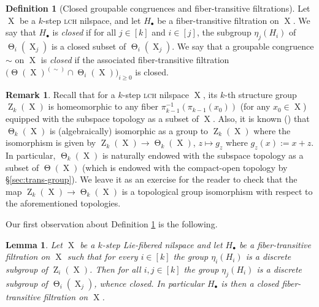 \documentclass[a4paper,12pt,reqno]{amsart}
\newtheorem{lemma}[theorem]{Lemma}
\theoremstyle{definition}
\newtheorem{defn}[theorem]{Definition}
\newtheorem{remark}[theorem]{Remark}
\def\to{\rightarrow}
\DeclareMathOperator{\ab}{Z}
\DeclareMathOperator{\tran}{\Theta}
\DeclareMathOperator{\ns}{X}
\begin{document}
\begin{defn}[Closed groupable congruences and fiber-transitive filtrations]\label{def:oldclosed}
Let $\ns$ be a $k$-step \textsc{lch} nilspace, and let $H_\bullet$ be a fiber-transitive filtration on $\ns$. We say that $H_\bullet$ is \emph{closed} if for all $j\in [k]$ and $i\in[j]$, the subgroup $\eta_j(H_i)$ of $\tran_i(\ns_j)$ is a closed subset of $\tran_i(\ns_j)$. We say that a groupable congruence $\sim$ on $\ns$ is \emph{closed} if the associated fiber-transitive filtration $\big(\tran(\ns)^{(\sim)}\cap \tran_i(\ns)\big)_{i\geq 0}$ is closed.
\end{defn}

\begin{remark}
Recall that for a $k$-step \textsc{lch} nilspace $\ns$, its $k$-th structure group $\ab_k(\ns)$ is  homeomorphic to any fiber $\pi_{k-1}^{-1}(\pi_{k-1}(x_0))$ (for any $x_0\in \ns$) equipped with the subspace topology as a subset of $\ns$. Also, it is known (\cite[Lemma 3.2.37]{Cand:Notes1}) that $\tran_k(\ns)$ is (algebraically) isomorphic as a group to $\ab_k(\ns)$ where the isomorphism is given by $\ab_k(\ns)\to \tran_k(\ns)$, $z\mapsto g_z$ where $g_z(x):=x+z$. In particular, $\tran_k(\ns)$ is naturally endowed with the subspace topology as a subset of $\tran(\ns)$ (which is endowed with the compact-open topology by \S \ref{sec:trans-group}). We leave it as an exercise for the reader to check that the map $\ab_k(\ns)\to \tran_k(\ns)$ is a topological group isomorphism with respect to the aforementioned topologies.
\end{remark}
\noindent Our first observation about Definition \ref{def:oldclosed} is the following.
\begin{lemma}\label{lem:closedconseq}
Let $\ns$ be a $k$-step Lie-fibered nilspace and let $H_\bullet$ be a fiber-transitive filtration on $\ns$ such that for every $i\in [k]$ the group $\eta_i(H_i)$ is a discrete subgroup of $\ab_i(\ns)$. Then for all $i,j\in [k]$ the group $\eta_j(H_i)$ is a discrete subgroup of $\tran_i(\ns_j)$, whence closed. In particular $H_\bullet$ is then a closed fiber-transitive filtration on $\ns$.
\end{lemma}
\end{document}
